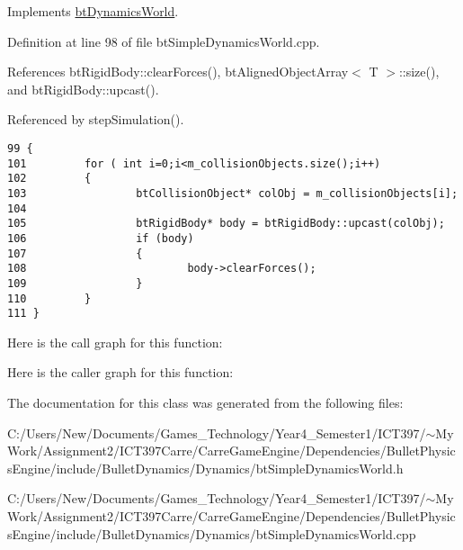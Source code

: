 Implements \hyperlink{classbt_dynamics_world}{btDynamicsWorld}.

Definition at line 98 of file btSimpleDynamicsWorld.cpp.

References btRigidBody::clearForces(), btAlignedObjectArray$<$ T $>$::size(), and btRigidBody::upcast().

Referenced by stepSimulation().

\begin{Code}\begin{verbatim}99 {
101         for ( int i=0;i<m_collisionObjects.size();i++)
102         {
103                 btCollisionObject* colObj = m_collisionObjects[i];
104                 
105                 btRigidBody* body = btRigidBody::upcast(colObj);
106                 if (body)
107                 {
108                         body->clearForces();
109                 }
110         }
111 }       
\end{verbatim}
\end{Code}




Here is the call graph for this function:

Here is the caller graph for this function:

The documentation for this class was generated from the following files:\begin{CompactItemize}
\item 
C:/Users/New/Documents/Games\_\-Technology/Year4\_\-Semester1/ICT397/$\sim$My Work/Assignment2/ICT397Carre/CarreGameEngine/Dependencies/BulletPhysicsEngine/include/BulletDynamics/Dynamics/btSimpleDynamicsWorld.h\item 
C:/Users/New/Documents/Games\_\-Technology/Year4\_\-Semester1/ICT397/$\sim$My Work/Assignment2/ICT397Carre/CarreGameEngine/Dependencies/BulletPhysicsEngine/include/BulletDynamics/Dynamics/btSimpleDynamicsWorld.cpp\end{CompactItemize}
